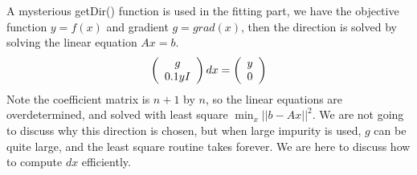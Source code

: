 \documentclass[]{article}
\begin{document}
A mysterious getDir() function is used in the fitting part, we have the objective function $y=f(x)$ and gradient $g=grad(x)$, then the direction is solved by solving the linear equation $Ax=b$.
\begin{equation}
  \left( 
  \begin{array}[c]{c}
    g\\
    0.1yI
  \end{array}
  \right)
    dx
  =\left( 
  \begin{array}[c]{c}
    y\\
    0
  \end{array}
  \right)
\end{equation}
Note the coefficient matrix is $n+1$ by $n$, so the linear equations are overdetermined, and solved with least square $\min_x||b-Ax||^2$. We are not going to discuss why this direction is
chosen, but when large impurity is used, $g$ can be quite large, and the least square routine takes forever. We are here to discuss how to compute $dx$ efficiently.
\end{document}
